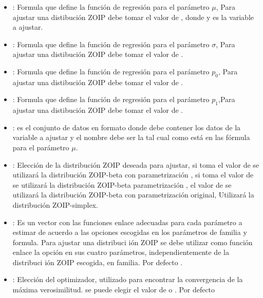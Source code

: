 \begin{itemize}[noitemsep, nolistsep]

\item {}: Formula que define la funci\'{o}n de regresi\'{o}n para el par\'{a}metro $\mu$, Para ajustar una distibuci\'{o}n ZOIP debe tomar el valor de , donde y es la variable a ajustar.
\item {}: Formula que define la funci\'{o}n de regresi\'{o}n para el par\'{a}metro $\sigma$, Para ajustar una distibuci\'{o}n ZOIP debe tomar el valor de .
\item {}: Formula que define la funci\'{o}n de regresi\'{o}n para el par\'{a}metro $p_0$, Para ajustar una distibuci\'{o}n ZOIP debe tomar el valor de .
\item {}: Formula que define la funci\'{o}n de regresi\'{o}n para el par\'{a}metro $p_1$,Para ajustar una distibuci\'{o}n ZOIP debe tomar el valor de .
\item {}: es el conjunto de datos en formato  donde debe contener los datos de la variable a ajustar y el nombre debe ser la tal cual como est\'{a} en las f\'{o}rmula para el par\'{a}metro $\mu$.
\item {}: Elecci\'{o}n de la distribuci\'{o}n ZOIP deseada para ajustar, si toma el valor de  se utilizar\'{a} la distribuci\'{o}n ZOIP-beta con parametrizaci\'{o}n  \cite{Stasinopoulos2}, si toma el valor de  se utilizar\'{a} la distribuci\'{o}n ZOIP-beta parametrizaci\'{o}n \cite{Ferrari2}, el valor de  se utilizar\'{a} la distribuci\'{o}n ZOIP-beta con parametrizaci\'{o}n original,  Utilizar\'{a} la distribuci\'{o}n ZOIP-simplex.
\item {}: Es un vector con las funciones enlace adecuadas para cada par\'{a}metro a estimar de acuerdo a las opciones escogidas en los par\'{a}metros de familia y formula. Para ajustar una distribuci i\'{o}n ZOIP se debe utilizar como funci\'{o}n enlace la opci\'{o}n  en sus cuatro par\'{a}metros, independientemente de la distribuci i\'{o}n ZOIP escogida, en familia. Por defecto .
\item {}: Elecci\'{o}n del optimizador, utilizado para encontrar la convergencia de la m\'{a}xima verosimilitud. se puede elegir el valor de  o . Por defecto 
\end{itemize}

